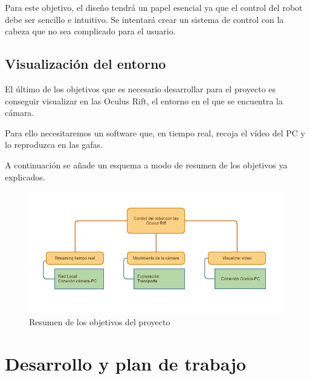 \documentclass[twoside, 11pt]{epstfg}
\begin{document}
Para este objetivo, el diseño tendrá un papel esencial ya que el control del robot debe ser sencillo e intuitivo. Se intentará crear un sistema de control con la cabeza que no sea complicado para el usuario.

\subsection{Visualización del entorno}
El último de los objetivos que es necesario desarrollar para el proyecto es conseguir visualizar en las Oculus Rift, el entorno en el que se encuentra la cámara.

Para ello necesitaremos un software que, en tiempo real, recoja el vídeo del PC y lo reproduzca en las gafas. 


A continuación se añade un esquema a modo de resumen de los objetivos ya explicados.

\begin{figure}[h!]
	\centerline{
		\mbox{\includegraphics[width=7.00in]{images/objetivos.png}}
	}
	\caption{Resumen de los objetivos del proyecto}
\end{figure}


\newpage
\section{Desarrollo y plan de trabajo}
\end{document}
